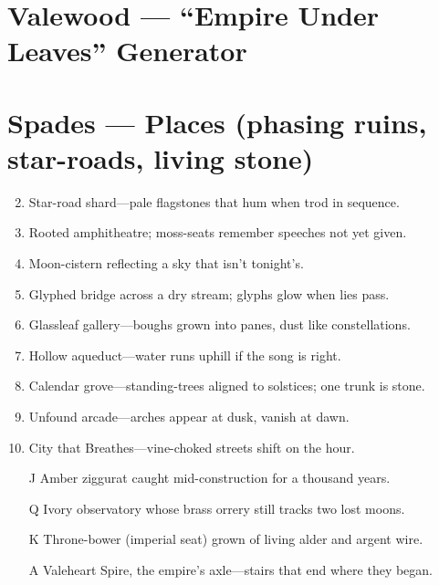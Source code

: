 \section{Valewood --- ``Empire Under Leaves'' Generator}
\label{chap:valewood}

\section*{Spades --- Places (phasing ruins, star-roads, living stone)}
\label{sec:valewood-places}
\begin{enumerate}
\setcounter{enumi}{1}
\item Star-road shard---pale flagstones that hum when trod in sequence.
\item Rooted amphitheatre; moss-seats remember speeches not yet given.
\item Moon-cistern reflecting a sky that isn't tonight's.
\item Glyphed bridge across a dry stream; glyphs glow when lies pass.
\item Glassleaf gallery---boughs grown into panes, dust like constellations.
\item Hollow aqueduct---water runs uphill if the song is right.
\item Calendar grove---standing-trees aligned to solstices; one trunk is stone.
\item Unfound arcade---arches appear at dusk, vanish at dawn.
\item City that Breathes---vine-choked streets shift on the hour.
\item[J] Amber ziggurat caught mid-construction for a thousand years.
\item[Q] Ivory observatory whose brass orrery still tracks two lost moons.
\item[K] Throne-bower (imperial seat) grown of living alder and argent wire.
\item[A] Valeheart Spire, the empire's axle---stairs that end where they began.
\end{enumerate}

